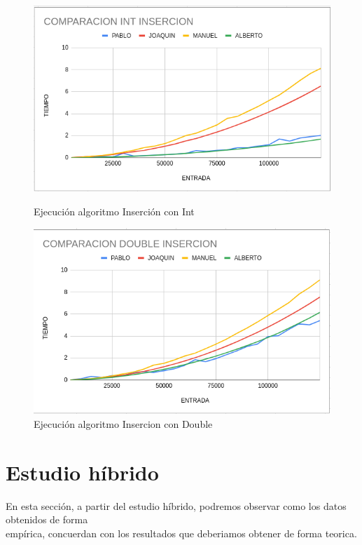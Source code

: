 \documentclass[11pt,openany]{book}
\begin{document}
\begin{figure}[H]
    \begin{minipage}{0.5\textwidth}
        \centering
        \includegraphics[width=\linewidth]{assets/Img/insercionordenadores.png}
        \caption{Ejecución algoritmo Inserción con Int}
        \label{fig:fibonacci}
    \end{minipage}
    \begin{minipage}{0.5\textwidth}
        \centering
        \includegraphics[width=\linewidth]{assets/Img/insercionordenadoresd.png}
        \caption{Ejecución algoritmo Insercion con Double}
    \end{minipage}
\end{figure}



\section{Estudio híbrido}
En esta sección, a partir del estudio híbrido, podremos observar como los datos obtenidos de forma \\
empírica, concuerdan con los resultados que deberiamos obtener de forma teorica.
\end{document}
